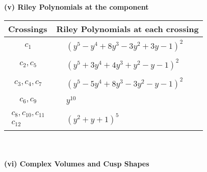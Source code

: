 \documentclass[1p]{elsarticle_modified}
\theoremstyle{definition}
\begin{document}
\newpage\renewcommand{\arraystretch}{1}
\flushleft \textbf{(v) Riley Polynomials at the component}\newline \\
\begin{tabular}{m{50pt}|m{274pt}}
Crossings & \hspace{64pt}Riley Polynomials at each crossing \\
\hline $$\begin{aligned}c_{1}\end{aligned}$$&$\begin{aligned}
&(y^5- y^4+8 y^3-3 y^2+3 y-1)^2
\end{aligned}$\\
\hline $$\begin{aligned}c_{2},c_{5}\end{aligned}$$&$\begin{aligned}
&(y^5+3 y^4+4 y^3+y^2- y-1)^2
\end{aligned}$\\
\hline $$\begin{aligned}c_{3},c_{4},c_{7}\end{aligned}$$&$\begin{aligned}
&(y^5-5 y^4+8 y^3-3 y^2- y-1)^2
\end{aligned}$\\
\hline $$\begin{aligned}c_{6},c_{9}\end{aligned}$$&$\begin{aligned}
&y^{10}
\end{aligned}$\\
\hline $$\begin{aligned}c_{8},c_{10},c_{11}\\c_{12}\end{aligned}$$&$\begin{aligned}
&(y^2+y+1)^5
\end{aligned}$\\
\hline
\end{tabular}\\~\\
\newpage\flushleft \textbf{(vi) Complex Volumes and Cusp Shapes}
\end{document}
